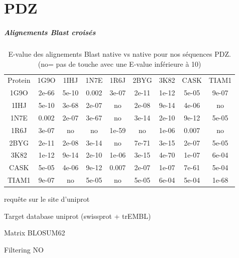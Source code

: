\chapter{PDZ}
\label{chap:PDZ}

    \clearpage

\paragraph{Alignements Blast croisés}


    \begin{table}[!htbp]
      \centering

      \begin{tabular}{ccccccccc}

        \toprule
        Protein & 1G9O & 1IHJ & 1N7E & 1R6J & 2BYG & 3K82 & CASK & TIAM1 \\
        \cmidrule{1-9}

        1G9O &  2e-66 & 5e-10 &  0.002 & 3e-07 & 2e-11 & 1e-12 & 5e-05 & 9e-07 \\     
        1IHJ &  5e-10 & 3e-68 &  2e-07 & no &   2e-08 & 9e-14 & 4e-06 & no    \\
        1N7E &  0.002 & 2e-07 &  3e-67 & no &    3e-14 & 2e-10 & 9e-12 & 5e-05 \\
        1R6J &  3e-07 & no  &    no  &  1e-59 &  no &   1e-06 & 0.007 & no    \\
        2BYG &  2e-11 & 2e-08 &  3e-14 & no &    7e-71 & 3e-15 & 2e-07 & 5e-05 \\
        3K82 &  1e-12 & 9e-14 &  2e-10 & 1e-06 & 3e-15 & 4e-70 & 1e-07 & 6e-04 \\
        CASK &  5e-05 & 4e-06 &  9e-12 & 0.007 & 2e-07 & 1e-07 & 7e-61 & 5e-04 \\
        TIAM1 & 9e-07 &  no &    5e-05 & no  &   5e-05 & 6e-04 & 5e-04 & 1e-68 \\
        \bottomrule


      \end{tabular}      
      \caption{E-value des alignements Blast native vs native pour nos séquences PDZ. (no= pas de touche avec une E-value inférieure à 10)}
\label{tab:Xblast}      
    \end{table}


requête sur le site d'uniprot

Target database uniprot (swissprot + trEMBL)

Matrix BLOSUM62

Filtering NO

